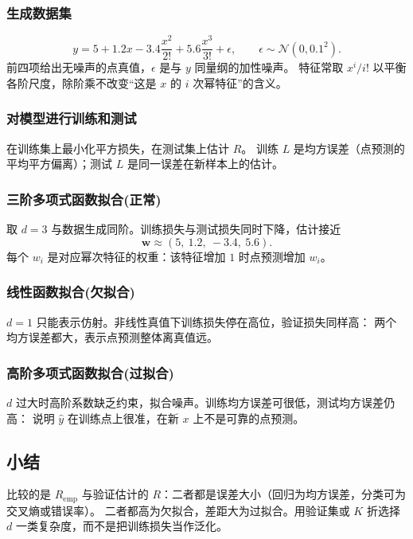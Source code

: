 \subsubsection{生成数据集}

\[
y=5+1.2x-3.4\frac{x^{2}}{2!}+5.6\frac{x^{3}}{3!}+\epsilon,
\qquad
\epsilon\sim\mathcal{N}(0,0.1^{2}).
\]
前四项给出无噪声的点真值，$\epsilon$ 是与 $y$ 同量纲的加性噪声。
特征常取 $x^{i}/i!$ 以平衡各阶尺度，除阶乘不改变“这是 $x$ 的 $i$ 次幂特征”的含义。

\subsubsection{对模型进行训练和测试}

在训练集上最小化平方损失，在测试集上估计 $R$。
训练 $L$ 是均方误差（点预测的平均平方偏离）；测试 $L$ 是同一误差在新样本上的估计。

\subsubsection{三阶多项式函数拟合(正常)}

取 $d=3$ 与数据生成同阶。训练损失与测试损失同时下降，估计接近
\[
\bm{w}\approx(5,\ 1.2,\ -3.4,\ 5.6).
\]
每个 $w_i$ 是对应幂次特征的权重：该特征增加 $1$ 时点预测增加 $w_i$。

\subsubsection{线性函数拟合(欠拟合)}

$d=1$ 只能表示仿射。非线性真值下训练损失停在高位，验证损失同样高：
两个均方误差都大，表示点预测整体离真值远。

\subsubsection{高阶多项式函数拟合(过拟合)}

$d$ 过大时高阶系数缺乏约束，拟合噪声。训练均方误差可很低，测试均方误差仍高：
说明 $\hat{y}$ 在训练点上很准，在新 $x$ 上不是可靠的点预测。

\subsection{小结}

比较的是 $R_{\mathrm{emp}}$ 与验证估计的 $R$：二者都是误差大小（回归为均方误差，分类可为交叉熵或错误率）。
二者都高为欠拟合，差距大为过拟合。用验证集或 $K$ 折选择 $d$ 一类复杂度，而不是把训练损失当作泛化。

